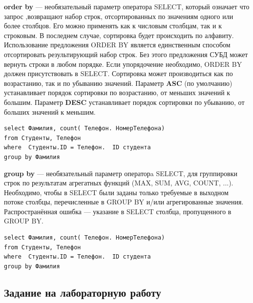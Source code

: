 \documentclass[a4paper]{article}
\begin{document}
\noindent\textbf{order by} --- необязательный параметр оператора SELECT, который означает что запрос ,возвращают набор строк, отсортированных по значениям одного или более столбцов. Его можно применять как к числовым столбцам, так и к строковым. В последнем случае, сортировка будет происходить по алфавиту. Использование предложения ORDER BY является единственным способом отсортировать результирующий набор строк. Без этого предложения СУБД может вернуть строки в любом порядке. Если упорядочение необходимо, ORDER BY должен присутствовать в SELECT. Сортировка может производиться как по возрастанию, так и по убыванию значений. Параметр \textbf{ASC} (по умолчанию) устанавливает порядок сортировки по возрастанию, от меньших значений к большим. Параметр \textbf{DESC} устанавливает порядок сортировки по убыванию, от больших значений к меньшим.

\begin{lstlisting}[label=group, caption=Запрос количества телефонов у студентов]
select Фамилия, count( Телефон. НомерТелефона)
from Студенты, Телефон
where  Студенты.ID = Телефон.  ID студента
group by Фамилия
\end{lstlisting}

\noindent\textbf{group by} --- необязательный параметр операторa SELECT, для группировки строк по результатам агрегатных функций (MAX, SUM, AVG, COUNT, ...). Необходимо, чтобы в SELECT были заданы только требуемые в выходном потоке столбцы, перечисленные в GROUP BY и/или агрегированные значения. Распространённая ошибка — указание в SELECT столбца, пропущенного в GROUP BY.

\begin{lstlisting}[label=group, caption=Запрос количества телефонов у студентов]
select Фамилия, count( Телефон. НомерТелефона)
from Студенты, Телефон
where  Студенты.ID = Телефон.  ID студента
group by Фамилия
\end{lstlisting}

\newpage
\subsection{Задание на лабораторную работу}
\end{document}
